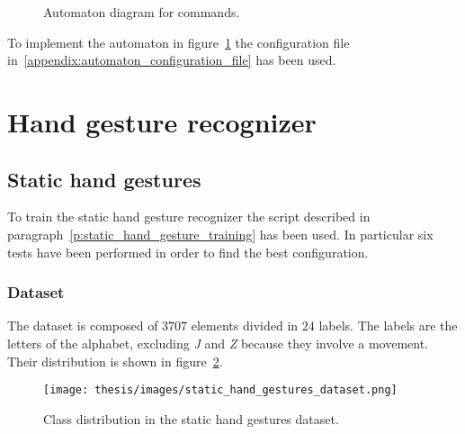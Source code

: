 \documentclass[../thesis.tex]{subfiles}
\begin{document}
\begin{figure}[h]
    \centering
    \caption{Automaton diagram for commands.}\label{fig:automata_for_commands}
\end{figure}
To implement the automaton in figure~\ref{fig:automata_for_commands} the configuration file in~\ref{appendix:automaton_configuration_file} has been used.

\section{Hand gesture recognizer}
\subsection{Static hand gestures}
To train the static hand gesture recognizer the script described in paragraph~\ref{p:static_hand_gesture_training} has been used. In particular six tests have been performed in order to find the best configuration.
\subsubsection{Dataset}\label{ss:dataset_static_gestures}
The dataset is composed of $3707$ elements divided in $24$ labels. The labels are the letters of the alphabet, excluding \textit{J} and \textit{Z} because they involve a movement. Their distribution is shown in figure~\ref{fig:class_distribution_static_hand_gestures}.
\begin{figure}[H]
    \centering
    \texttt{[image: thesis/images/static\_hand\_gestures\_dataset.png]}
    \caption{Class distribution in the static hand gestures dataset.}
    \label{fig:class_distribution_static_hand_gestures}
\end{figure}
\end{document}
